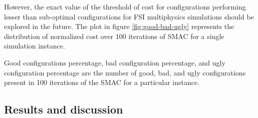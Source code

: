 However, the exact value of the threshold of cost for configurations performing lesser than sub-optimal configurations for FSI multiphysics simulations should be explored in the future. The plot in figure \ref{fig:good-bad-ugly} represents the distribution of normalized cost over 100 iterations of SMAC for a single simulation instance.






Good configurations percentage, bad configuration percentage, and ugly configuration percentage are the number of good, bad, and ugly configurations present in 100 iterations of the SMAC for a particular instance. 

\subsection{Results and discussion}

